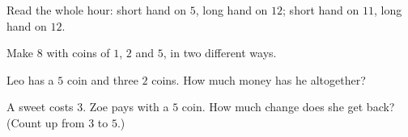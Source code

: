 \begin{exercise}[$\star$]\label{exo:g1:measure:6}
Read the whole hour: short hand on $5$, long hand on $12$; short
hand on $11$, long hand on $12$.
\end{exercise}

\begin{exercise}[$\star$]\label{exo:g1:measure:7}
Make $8$ with coins of $1$, $2$ and $5$, in two different ways.
\end{exercise}

\begin{exercise}[$\star$]\label{exo:g1:measure:8}
Leo has a $5$ coin and three $2$ coins. How much money has he
altogether?
\end{exercise}

\begin{exercise}[$\star\star$]\label{exo:g1:measure:9}
A sweet costs $3$. Zoe pays with a $5$ coin. How much change does
she get back? (Count up from $3$ to $5$.)
\end{exercise}
